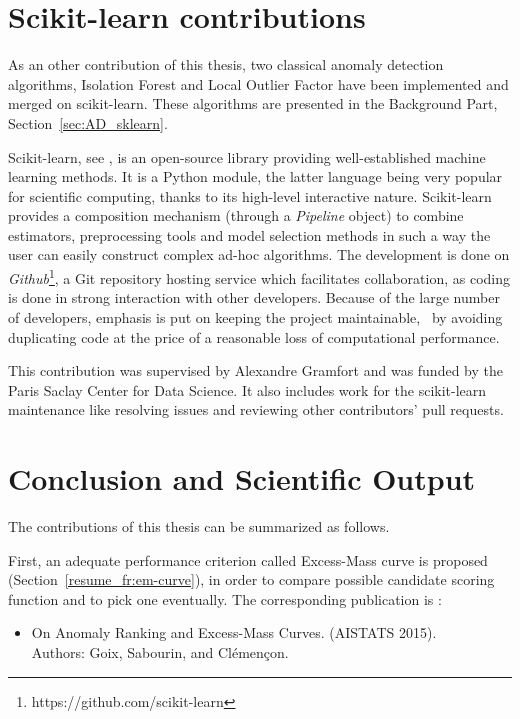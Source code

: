 \section{Scikit-learn contributions}
\label{resume_fr:sec:impl}

As an other contribution of this thesis, two classical anomaly detection algorithms, Isolation Forest and Local Outlier Factor have been implemented and merged on scikit-learn. These algorithms are presented in the Background Part, Section~\ref{sec:AD_sklearn}. %

Scikit-learn, see \cite{sklearn2011}, is an open-source library providing well-established machine learning methods.
It is a Python module, the latter language being very popular for scientific computing, thanks to its high-level interactive nature. %
Scikit-learn provides a composition mechanism (through a \emph{Pipeline} object) to combine estimators, preprocessing tools and model selection methods in such a way the user can easily construct complex ad-hoc algorithms.
%
The development is done on \emph{Github}\footnote{https://github.com/scikit-learn}, a Git repository hosting service which facilitates collaboration, as coding is done in strong interaction with other developers. Because of the large number of developers, emphasis is put on keeping the project maintainable, \eg~by avoiding duplicating code at the price of a reasonable loss of computational performance.%


This contribution was supervised by Alexandre Gramfort and was funded by the Paris Saclay Center for Data Science. It also includes work for the scikit-learn maintenance like resolving issues and reviewing other contributors' pull requests.



\section{Conclusion and Scientific Output}
\label{resume_fr:intro:concl}
The contributions of this thesis can be summarized as follows. 

First, an adequate performance criterion called Excess-Mass curve is proposed (Section~\ref{resume_fr:em-curve}), in order to compare possible candidate scoring function and to pick one eventually. 
The corresponding publication is \cite{AISTAT15}:
\begin{itemize}
\item On Anomaly Ranking and Excess-Mass Curves. (AISTATS 2015).\\
Authors: Goix, Sabourin, and Clémençon. 
\end{itemize}

